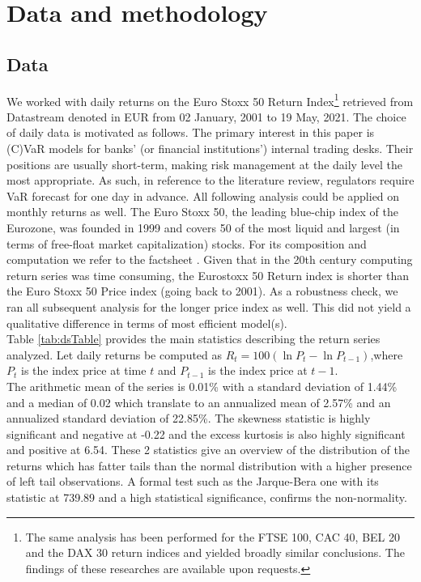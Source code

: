 \documentclass[a4paper, nobind]{templates/ociamthesis}
\renewcommand{\chaptermark}[1]{\markboth{\thechapter. #1}{\thechapter. #1}}
\begin{document}
\hypertarget{dat-and-meth}{%
\chapter{Data and methodology}\label{dat-and-meth}}

\chaptermark{Data and methodology}

\minitoc 

\hypertarget{data}{%
\section{Data}\label{data}}

\noindent We worked with daily returns on the Euro Stoxx 50 Return Index\footnote{The same analysis has been performed for the FTSE 100, CAC 40, BEL 20 and the DAX 30 return indices and yielded broadly similar conclusions. The findings of these researches are available upon requests.} retrieved from Datastream denoted in EUR from 02 January, 2001 to 19 May, 2021. The choice of daily data is motivated as follows. The primary interest in this paper is (C)VaR models for banks' (or financial institutions') internal trading desks. Their positions are usually short-term, making risk management at the daily level the most appropriate. As such, in reference to the literature review, regulators require VaR forecast for one day in advance. All following analysis could be applied on monthly returns as well. The Euro Stoxx 50, the leading blue-chip index of the Eurozone, was founded in 1999 and covers 50 of the most liquid and largest (in terms of free-float market capitalization) stocks. For its composition and computation we refer to the factsheet \autocite{EUROSTOXXFactSheet}. Given that in the 20th century computing return series was time consuming, the Eurostoxx 50 Return index is shorter than the Euro Stoxx 50 Price index (going back to 2001). As a robustness check, we ran all subsequent analysis for the longer price index as well. This did not yield a qualitative difference in terms of most efficient model(s).~\\

\noindent Table \ref{tab:dsTable} provides the main statistics describing the return series analyzed. Let daily returns be computed as \(R_{t}=100\left(\ln P_{t}-\ln P_{t-1}\right)\),where \(P_{t}\) is the index price at time \(t\) and \(P_{t-1}\) is the index price at \(t-1\).~\\

\noindent The arithmetic mean of the series is 0.01\% with a standard deviation of 1.44\% and a median of 0.02 which translate to an annualized mean of 2.57\% and an annualized standard deviation of 22.85\%. The skewness statistic is highly significant and negative at -0.22 and the excess kurtosis is also highly significant and positive at 6.54. These 2 statistics give an overview of the distribution of the returns which has fatter tails than the normal distribution with a higher presence of left tail observations. A formal test such as the Jarque-Bera one with its statistic at 739.89 and a high statistical significance, confirms the non-normality.~\\
\end{document}

